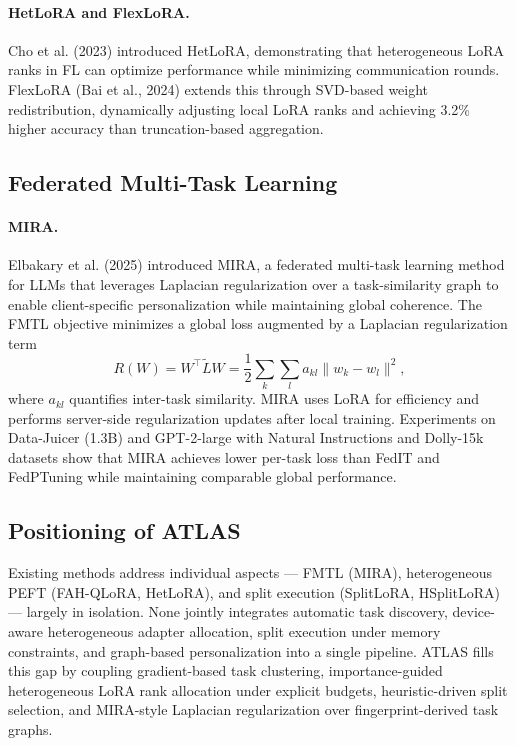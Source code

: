 \documentclass[11pt,a4paper]{article}
\begin{document}
\paragraph{HetLoRA and FlexLoRA.}
Cho et al. (2023) introduced HetLoRA, demonstrating that heterogeneous LoRA ranks in FL can optimize performance while minimizing communication rounds. FlexLoRA (Bai et al., 2024) extends this through SVD-based weight redistribution, dynamically adjusting local LoRA ranks and achieving 3.2\% higher accuracy than truncation-based aggregation.

\subsection{Federated Multi-Task Learning}

\paragraph{MIRA.}
Elbakary et al. (2025) introduced MIRA, a federated multi-task learning method for LLMs that leverages Laplacian regularization over a task-similarity graph to enable client-specific personalization while maintaining global coherence. The FMTL objective minimizes a global loss augmented by a Laplacian regularization term
\[
R(W) = W^\top \tilde{L} W = \frac{1}{2}\sum_k\sum_l a_{kl}\|w_k - w_l\|^2,
\]
where $a_{kl}$ quantifies inter-task similarity. MIRA uses LoRA for efficiency and performs server-side regularization updates after local training. Experiments on Data-Juicer (1.3B) and GPT-2-large with Natural Instructions and Dolly-15k datasets show that MIRA achieves lower per-task loss than FedIT and FedPTuning while maintaining comparable global performance.

\subsection{Positioning of ATLAS}

Existing methods address individual aspects --- FMTL (MIRA), heterogeneous PEFT (FAH-QLoRA, HetLoRA), and split execution (SplitLoRA, HSplitLoRA) --- largely in isolation. None jointly integrates automatic task discovery, device-aware heterogeneous adapter allocation, split execution under memory constraints, and graph-based personalization into a single pipeline. ATLAS fills this gap by coupling gradient-based task clustering, importance-guided heterogeneous LoRA rank allocation under explicit budgets, heuristic-driven split selection, and MIRA-style Laplacian regularization over fingerprint-derived task graphs.
\end{document}
